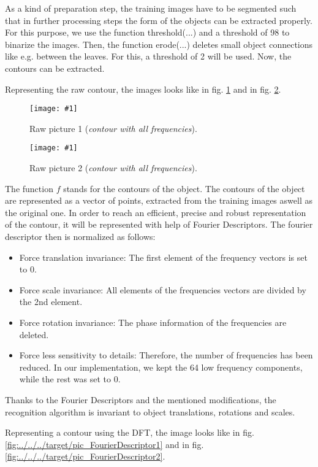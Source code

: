 \documentclass[a4paper,headings=small]{scrartcl}
\numberwithin{equation}{section} %
\numberwithin{figure}{section}   %
\newcommand{\image}[3]{
	\begin{figure}[htbp]
		\centering
		\texttt{[image: \#1]}
		\caption{#3}
		\label{fig:#1}
	\end{figure}
}
\newcommand{\generatedImgRoot}{../../../target}
\newcommand{\iBinThreshold}{98}
\newcommand{\iNumOfErosions}{2}
\newcommand{\iFDNormDimensions}{64} %
\begin{document}
As a kind of preparation step, the training images have to be segmented such that in 
further processing steps the form of the objects can be extracted properly.
For this purpose, we use the function threshold(...) and a threshold of \iBinThreshold{} to binarize the images.
Then, the function erode(...) deletes small object connections like e.g. between the leaves.
For this, a threshold of \iNumOfErosions{} will be used.
Now, the contours can be extracted.

Representing the raw contour, the images looks like in fig. \ref{fig:\generatedImgRoot/pic_RawFourierDescriptor1} 
and in fig. \ref{fig:\generatedImgRoot/pic_RawFourierDescriptor2}.

\image{\generatedImgRoot/pic_RawFourierDescriptor1}{0.2}{%
		Raw picture 1 (\emph{contour with all frequencies}).}
\image{\generatedImgRoot/pic_RawFourierDescriptor2}{0.5}{%
		Raw picture 2 (\emph{contour with all frequencies}).}


The function $f$ stands for the contours of the object.
The contours of the object are represented as a vector of points, extracted from the training
images aswell as the original one. In order to reach an efficient, precise and robust representation of the contour, 
it will be represented with help of Fourier Descriptors. The fourier descriptor then is normalized as follows:

\begin{itemize}
\item Force translation invariance: The first element of the frequency vectors is set to 0.
\item Force scale invariance:  All elements of the frequencies vectors are divided by the 2nd element.
\item Force rotation invariance: The phase information of the frequencies are deleted.
\item Force less sensitivity to details: Therefore, the number of frequencies has been reduced.
In our implementation, we kept the \iFDNormDimensions{} low frequency components, while the rest was set to 0.
\end{itemize}

Thanks to the Fourier Descriptors and the mentioned modifications, 
the recognition algorithm is invariant to object translations,
rotations and scales.

Representing a contour using the DFT, the image looks like in fig. \ref{fig:\generatedImgRoot/pic_FourierDescriptor1} 
and in fig. \ref{fig:\generatedImgRoot/pic_FourierDescriptor2}.
\end{document}
